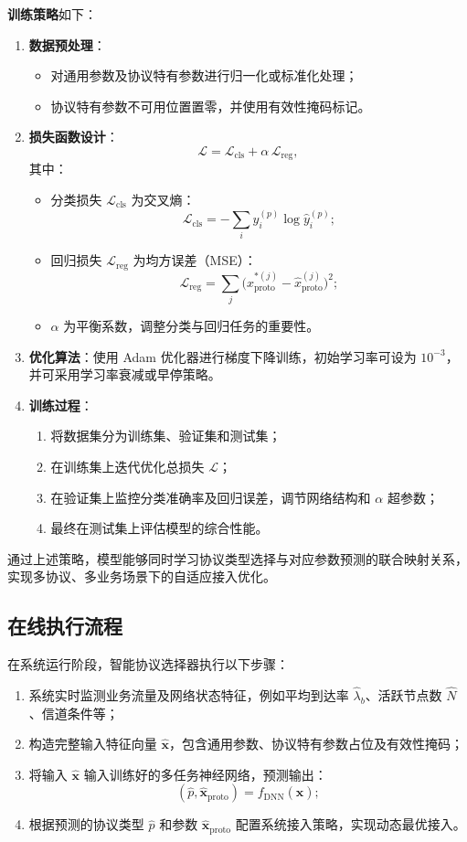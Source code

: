 \textbf{训练策略}如下：
\begin{enumerate}
	\item \textbf{数据预处理}：
	\begin{itemize}
		\item 对通用参数及协议特有参数进行归一化或标准化处理；
		\item 协议特有参数不可用位置置零，并使用有效性掩码标记。
	\end{itemize}
	\item \textbf{损失函数设计}：
	\[
	\mathcal{L} = \mathcal{L}_\text{cls} + \alpha \, \mathcal{L}_\text{reg},
	\]
	其中：
	\begin{itemize}
		\item 分类损失 \(\mathcal{L}_\text{cls}\) 为交叉熵：
		\[
		\mathcal{L}_\text{cls} = - \sum_i y_i^{(p)} \log \hat{y}_i^{(p)};
		\]
		\item 回归损失 \(\mathcal{L}_\text{reg}\) 为均方误差（MSE）：
		\[
		\mathcal{L}_\text{reg} = \sum_j \big(x^{*(j)}_\text{proto} - \hat{x}^{(j)}_\text{proto}\big)^2;
		\]
		\item \(\alpha\) 为平衡系数，调整分类与回归任务的重要性。
	\end{itemize}
	\item \textbf{优化算法}：使用 Adam 优化器进行梯度下降训练，初始学习率可设为 $10^{-3}$，并可采用学习率衰减或早停策略。
	\item \textbf{训练过程}：
	\begin{enumerate}
		\item 将数据集分为训练集、验证集和测试集；
		\item 在训练集上迭代优化总损失 $\mathcal{L}$；
		\item 在验证集上监控分类准确率及回归误差，调节网络结构和 \(\alpha\) 超参数；
		\item 最终在测试集上评估模型的综合性能。
	\end{enumerate}
\end{enumerate}

通过上述策略，模型能够同时学习协议类型选择与对应参数预测的联合映射关系，实现多协议、多业务场景下的自适应接入优化。

\subsection{在线执行流程}

在系统运行阶段，智能协议选择器执行以下步骤：
\begin{enumerate}
	\item 系统实时监测业务流量及网络状态特征，例如平均到达率 $\hat{\lambda}_b$、活跃节点数 $\hat{N}$、信道条件等；
	\item 构造完整输入特征向量 $\hat{\mathbf{x}}$，包含通用参数、协议特有参数占位及有效性掩码；
	\item 将输入 $\hat{\mathbf{x}}$ 输入训练好的多任务神经网络，预测输出：
	\[
	(\hat{p}, \hat{\mathbf{x}}_\text{proto}) = f_\text{DNN}(\hat{\mathbf{x}});
	\]
	\item 根据预测的协议类型 $\hat{p}$ 和参数 $\hat{\mathbf{x}}_\text{proto}$ 配置系统接入策略，实现动态最优接入。
\end{enumerate}


